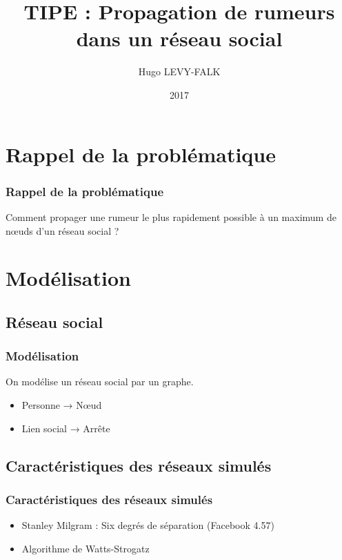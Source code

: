 \documentclass{beamer}
\title[Propagation de rumeurs dans un réseau social]{TIPE : Propagation de rumeurs dans un réseau social}
\author{Hugo LEVY-FALK}
\date{2017}
\begin{document}
\begin{frame}
  \titlepage
\end{frame}

\section{Rappel de la problématique}
\begin{frame}
  \frametitle{Rappel de la problématique}
  \begin{center}
  Comment propager une rumeur le plus rapidement possible à un maximum de nœuds d'un réseau social ?
  \end{center}
\end{frame}

\section{Modélisation}
\subsection{Réseau social}
\begin{frame}
  \frametitle{Modélisation}
  On modélise un réseau social par un graphe.
  \begin{itemize}
    \item<2-> Personne → Nœud
    \item<3-> Lien social → Arrête
  \end{itemize}
\end{frame}
\subsection{Caractéristiques des réseaux simulés}
\begin{frame}
  \frametitle{Caractéristiques des réseaux simulés}
  \begin{itemize}
    \item<2-> Stanley Milgram : Six degrés de séparation (Facebook 4.57)
    \item<3-> Algorithme de Watts-Strogatz
  \end{itemize}
\end{frame}
\end{document}
